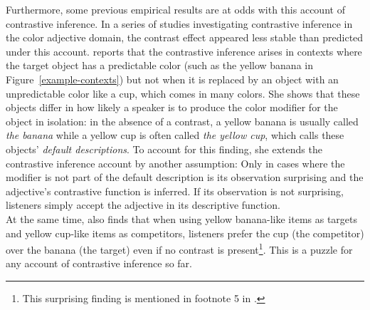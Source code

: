 \documentclass[a4paper,man,floatsintext,natbib]{apa6}
\newcommand{\figref}[1]{Figure~\ref{#1}}
\begin{document}
Furthermore, some previous empirical results are at odds with this account of contrastive inference. In a series of studies investigating contrastive inference in the color adjective domain, the contrast effect appeared less stable than predicted under this account. \cite{Sedivy:2003} reports that the contrastive inference arises in contexts where the target object has a predictable color (such as the yellow banana in \figref{example-contexts}) but not when it is replaced by an object with an unpredictable color like a cup, which comes in many colors.
She shows that these objects differ in how likely a speaker is to produce the color modifier for the object in isolation: in the absence of a contrast, a yellow banana is usually called \textit{the banana} while a yellow cup is often called \textit{the yellow cup}, which \citeauthor{Sedivy:2003} calls these objects' \emph{default descriptions}. To account for this finding, she extends the contrastive inference account by another assumption: Only in cases where the modifier is not part of the default description is its observation surprising and the adjective's contrastive function is inferred. If its observation is not surprising, listeners simply accept the adjective in its descriptive function.\\
At the same time, \cite{Sedivy:2003} also finds that when using yellow banana-like items as targets and yellow cup-like items as competitors, listeners prefer the cup (the competitor) over the banana (the target) even if no contrast is present\footnote{This surprising finding is mentioned in footnote 5 in \cite{Sedivy:2003}.}. This is a puzzle for any account of contrastive inference so far.

\end{document}
